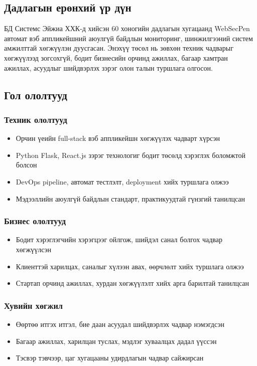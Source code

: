 \documentclass[main.tex]{subfiles}
\begin{document}
\subsection{Дадлагын ерөнхий үр дүн}

БД Системс Эйжиа ХХК-д хийсэн 60 хоногийн дадлагын хугацаанд WebSecPen автомат вэб аппликейшний аюулгүй байдлын мониторинг, шинжилгээний систем амжилттай хөгжүүлэн дуусгасан. Энэхүү төсөл нь зөвхөн техник чадварыг хөгжүүлээд зогсохгүй, бодит бизнесийн орчинд ажиллах, багаар хамтран ажиллах, асуудлыг шийдвэрлэх зэрэг олон талын туршлага олгосон.

\subsection{Гол ололтууд}

\subsubsection{Техник ололтууд}
\begin{itemize}
    \item Орчин үеийн full-stack вэб аппликейшн хөгжүүлэх чадварт хүрсэн
    \item Python Flask, React.js зэрэг технологиг бодит төсөлд хэрэглэх боломжтой болсон
    \item DevOps pipeline, автомат тестлэлт, deployment хийх туршлага олжээ
    \item Мэдээллийн аюулгүй байдлын стандарт, практикуудтай гүнзгий танилцсан
\end{itemize}

\subsubsection{Бизнес ололтууд}
\begin{itemize}
    \item Бодит хэрэглэгчийн хэрэгцээг ойлгож, шийдэл санал болгох чадвар хөгжүүлсэн
    \item Клиенттэй харилцах, саналыг хүлээн авах, өөрчлөлт хийх туршлага олжээ
    \item Стартап орчинд ажиллах, хурдан хөгжүүлэлт хийх арга барилтай танилцсан
\end{itemize}

\subsubsection{Хувийн хөгжил}
\begin{itemize}
    \item Өөртөө итгэх итгэл, бие даан асуудал шийдвэрлэх чадвар нэмэгдсэн
    \item Багаар ажиллах, харилцан туслах, мэдлэг хуваалцах дадал үүссэн
    \item Тэсвэр тэвчээр, цаг хугацааны удирдлагын чадвар сайжирсан
\end{itemize}
\end{document}
